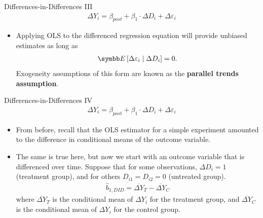 \documentclass[aspectratio=169,11pt]{beamer}
\begin{document}
\begin{frame}{Differences-in-Differences III}
\begin{align*}
  \Delta Y_{i}=\beta_{post} + \beta_{1}  \cdot \Delta D_{i}+ \Delta \varepsilon_{i}
\end{align*}

\begin{itemize}
  \item Applying OLS to the differenced regression equation will provide unbiased
  estimates as long as
  \begin{align*}
  \E\left[ \Delta \varepsilon_{i} \mid \Delta D_{i} \right] =0.
  \end{align*}
  Exogeneity assumptions of this form are known as the {\bf parallel trends
  assumption}.

\end{itemize}
\end{frame}

\begin{frame}{Differences-in-Differences IV}
\begin{align*}
  \Delta Y_{i}=\beta_{post} + \beta_{1} \cdot \Delta D_{i}+ \Delta \varepsilon_{i}
\end{align*}
\begin{itemize}
  \item From before, recall that the OLS estimator for a simple experiment
  amounted to the difference in conditional means of the outcome variable.

  \medskip
  \item The same is true here, but now we start with an outcome variable that
  is differenced over time. Suppose that for some observations, $\Delta D_{i}=1$
  (treatment group), and for others $D_{i1}=D_{i2}=0$ (untreated group).
  \begin{align*}
\hat{b}_{1,DID}=\overline{\Delta Y}_{T}-\overline{\Delta Y}_{C}
\end{align*}
where $\overline{\Delta Y}_{T}$ is the conditional mean of $\Delta Y_{i}$
for the treatment group, and $\overline{\Delta Y}_{C}$ is the conditional
mean of $\Delta Y_{i}$ for the control group.

\end{itemize}
\end{frame}
\end{document}
